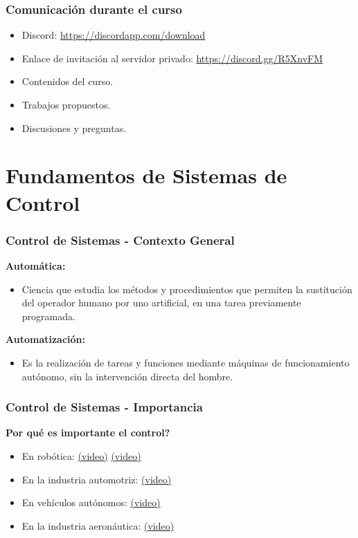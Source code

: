 \documentclass[aspectratio=169,handout]{beamer}
\theoremstyle{definition}
\theoremstyle{plain}
\theoremstyle{remark}
\begin{document}
\begin{frame}[c]\frametitle{Comunicación durante el curso}
\begin{itemize}
  \item Discord: \url{https://discordapp.com/download}
  \item Enlace de invitación al servidor privado: \url{https://discord.gg/R5XnvFM}
  \item Contenidos del curso.
  \item Trabajos propuestos.
  \item Discusiones y preguntas.
\end{itemize}
\end{frame}

\section{Fundamentos de Sistemas de Control}

\begin{frame}[<+->][c]\frametitle{Control de Sistemas - Contexto General}
  \textbf{Automática:}
  \begin{itemize}
    \item Ciencia que estudia los métodos y procedimientos que permiten la sustitución del operador humano por uno artificial, en una tarea previamente programada.
  \end{itemize}
  \textbf{Automatización:}
  \begin{itemize}
    \item Es la realización de tareas y funciones mediante máquinas de funcionamiento autónomo, sin la intervención directa del hombre.
  \end{itemize}
\end{frame}

\begin{frame}[c]\frametitle{Control de Sistemas - Importancia}
\textbf{Por qué es importante el control?}
\begin{itemize}
  \item En robótica: \href{https://www.youtube.com/watch?v=wlkCQXHEgjA}{(video)} \href{https://www.youtube.com/watch?v=_sBBaNYex3E}{(video)}
  \item En la industria automotriz: \href{https://www.youtube.com/watch?v=rbki4HR41-4}{(video)}
  \item En vehículos autónomos: \href{https://www.youtube.com/watch?v=tlThdr3O5Qo}{(video)}
  \item En la industria aeronáutica: \href{https://www.youtube.com/watch?v=GrP3jHuLQ9o}{(video)}
\end{itemize}
\end{frame}
\end{document}
